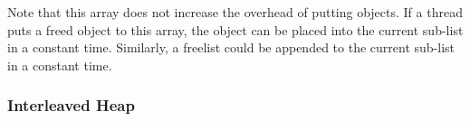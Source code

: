 
Note that this array does not increase the overhead of putting objects. If a thread puts a freed object to this array, the object can be placed into the current sub-list in a constant time. Similarly, a freelist could be appended to the current sub-list in a constant time. 
\subsubsection{Interleaved Heap} 


